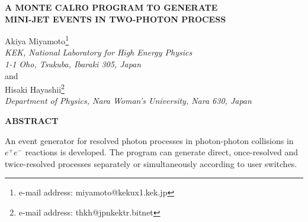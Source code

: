 %
%
%






%
%


\begin{center}
{\bf \vglue 10pt 
   A MONTE CALRO PROGRAM TO GENERATE  \\                      
               \vglue 3pt                                                       
   MINI-JET EVENTS IN TWO-PHOTON PROCESS \\}
\end{center}
\vglue 5pt

\begin{center}
Akiya Miyamoto\footnote{e-mail address: miyamoto@kekux1.kek.jp} \\
{\it KEK, National Laboratory for High Energy Physics\\
1-1 Oho, Tsukuba, Ibaraki 305, Japan} \\
and \\
Hisaki Hayashii\footnote{e-mail address: thkh@jpnkektr.bitnet} \\
{\it Department of Physics, Nara Woman's University, 
Nara 630, Japan}
\end{center}

\vglue 0.3cm
\begin{center}{\bf ABSTRACT} \end{center}
An event generator for resolved photon processes in photon-photon
collisions in $e^+e^-$ reactions
is developed.  The program can generate direct, once-resolved
and twice-resolved processes separately or simultaneously according
to user switches.


\baselineskip=14pt


%
%

